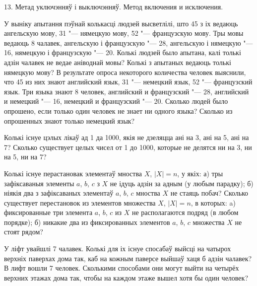 



\biLangHeader
{13. Метад уключэнняў і выключэнняў.}
{Метод включения и исключения.}

\begin{problemList}

\problemItemSimple
{У выніку апытання пэўнай колькасці людзей высветлілі, што 45 з іх
ведаюць ангельскую мову, 31 "--- нямецкую мову, 52 "--- французскую мову.
Тры мовы ведаюць 8 чалавек, ангельскую і французскую "--- 28, ангельскую і нямецкую "--- 16,
нямецкую і французскую "--- 20. Колькі людзей было апытана, калі толькі адзін чалавек не ведае
аніводнай мовы? Колькі з апытаных ведаюць толькі нямецкую мову?}
{В результате опроса некоторого количества человек выяснили, что 45
из них знают английский язык, 31 "--- немецкий язык, 52 "--- французский язык.
Три языка знают 8 человек, английский и французский "--- 28, английский и
немецкий "--- 16, немецкий и французский "--- 20. Сколько людей было опрошено,
если только один человек не знает ни одного языка? Сколько из опрошенных
знают только немецкий язык?}

\bigskip

\problemItemSimple
{Колькі існуе цэлых лікаў ад 1 да 1000, якія не дзеляцца ані на 3, ані на 5, ані на 7?}
{Сколько существует целых чисел от 1 до 1000, которые не делятся ни
на 3, ни на 5, ни на 7?}

\bigskip

\problemItemSimple
{Колькі існуе перастановак элементаў мноства $X$, $|X| = n$, у якіх:
а) тры зафіксаваныя элементы $a$, $b$, $c$ з $X$ не ідуць адзін за адным (у любым парадку);
б) ніякія два з зафіксаваных элементаў $a$, $b$, $c$ мноства $X$ не стаяць побач?}
{Сколько существует перестановок из элементов множества $X$, $|X| = n$,
в которых: a) фиксированные три элемента $a$, $b$, $c$ из $X$ не располагаются
подряд (в любом порядке); б) никакие два из фиксированных элементов $a$, $b$, $c$
множества $X$ не стоят рядом?}

\bigskip

\problemItemSimple
{У ліфт увайшлі 7 чалавек. Колькі для іх існуе спосабаў выйсці на чатырох верхніх паверхах дома так,
каб на кожным паверсе выйшаў хаця б адзін чалавек?}
{В лифт вошли 7 человек. Сколькими способами они могут выйти на четырёх
верхних этажах дома так, чтобы на каждом этаже вышел хотя бы один человек?}

\bigskip


\end{problemList}
